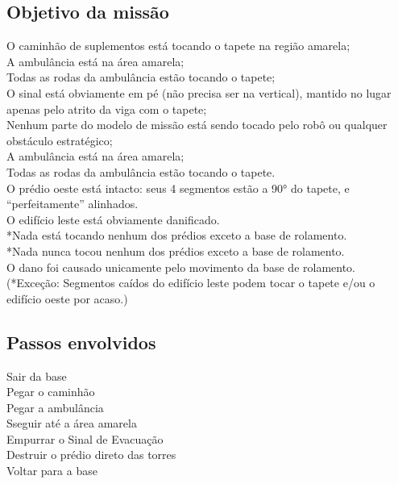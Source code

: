 \documentclass{article}
\begin{document}
	\subsection{Objetivo da missão}
		O caminhão de suplementos está tocando o tapete na região amarela;\\
		A ambulância está na área amarela;\\		
		Todas as rodas da ambulância estão tocando o tapete;\\
		O sinal está obviamente em pé (não precisa ser na vertical), mantido no lugar apenas pelo atrito da viga com o tapete;\\
		Nenhum parte do modelo de missão está sendo tocado pelo robô ou qualquer obstáculo estratégico;\\
		A ambulância está na área amarela;\\
		Todas as rodas da ambulância estão tocando o tapete.\\
		O prédio oeste está intacto: seus 4 segmentos estão a 90° do tapete, e “perfeitamente” alinhados.\\
		O edifício leste está obviamente danificado.\\
		*Nada está tocando nenhum dos prédios exceto a base de rolamento.\\
		*Nada nunca tocou nenhum dos prédios exceto a base de rolamento.\\
		O dano foi causado unicamente pelo movimento da base de rolamento.\\
		(*Exceção: Segmentos caídos do edifício leste podem tocar o tapete e/ou o edifício oeste
		por acaso.)\\

	\subsection{Passos envolvidos}
		Sair da base\\
		Pegar o caminhão\\
		Pegar a ambulância\\
		Sseguir até a área amarela\\
		Empurrar o Sinal de Evacuação\\
		Destruir o prédio direto das torres\\
		Voltar para a base\\
\end{document}
